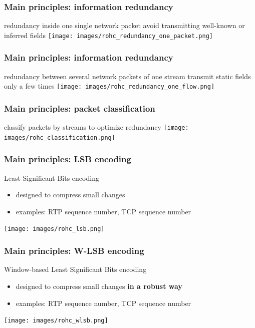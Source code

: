 \documentclass[utf8]{beamer}
\begin{document}
\begin{frame}
	\frametitle{Main principles: information redundancy}
	\begin{block}{redundancy inside one single network packet}
		avoid transmitting well-known or inferred fields
		\texttt{[image: images/rohc\_redundancy\_one\_packet.png]}
	\end{block}
\end{frame}

\begin{frame}
	\frametitle{Main principles: information redundancy}
	\begin{block}{redundancy between several network packets of one stream}
		transmit static fields only a few times
		\texttt{[image: images/rohc\_redundancy\_one\_flow.png]}
	\end{block}
\end{frame}

\begin{frame}
	\frametitle{Main principles: packet classification}
	\begin{block}{classify packets by streams to optimize redundancy}
		\texttt{[image: images/rohc\_classification.png]}
	\end{block}
\end{frame}

\begin{frame}
	\frametitle{Main principles: LSB encoding}
	\begin{block}{Least Significant Bits encoding}
		\begin{itemize}
			\item designed to compress small changes
			\item examples: RTP sequence number, TCP sequence number
		\end{itemize}
		\texttt{[image: images/rohc\_lsb.png]}
	\end{block}
\end{frame}

\begin{frame}
	\frametitle{Main principles: W-LSB encoding}
	\begin{block}{Window-based Least Significant Bits encoding}
		\begin{itemize}
			\item designed to compress small changes {\bf in a robust way}
			\item examples: RTP sequence number, TCP sequence number
		\end{itemize}
		\texttt{[image: images/rohc\_wlsb.png]}
	\end{block}
\end{frame}
\end{document}
